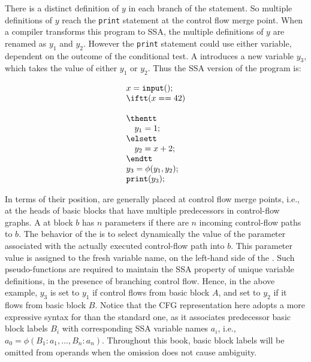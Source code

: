 There is a distinct definition of $y$ in each branch of the \iftt statement. 
So multiple definitions of $y$ reach the \texttt{print} statement at the control flow merge point. 
When a compiler transforms this program to SSA, the multiple definitions of $y$ are renamed as $y_1$ and $y_2$. 
However the \texttt{print} statement could use either variable, dependent on the outcome of the \iftt conditional test. 
A \phifun introduces a new variable $y_3$, which takes the value of either $y_1$ or $y_2$. 
Thus the SSA version of the program is:
\smallskip

\begin{minipage}{0.4\textwidth}
\begin{equation*}
\begin{array}{l}
x = \texttt{input}();\\
\iftt (x == 42)\\
\\
\thentt\\
\quad    y_1 = 1;\\
\elsett\\
\quad    y_2 = x + 2;\\
\endtt\\
y_3 = \phi(y_1,y_2);\\
\texttt{print}(y_3);\\
\end{array}
\end{equation*}
\end{minipage}
\begin{minipage}{0.4\textwidth}
\strut
\end{minipage}
\bigskip


In terms of their position, \phifuns{} are generally placed at control flow merge points, i.e., at the heads of basic blocks that have multiple predecessors in control-flow graphs. 
A \phifun at block $b$ has $n$ parameters if there are $n$ incoming control-flow paths to $b$. 
The behavior of the \phifun is to select dynamically the value of the parameter associated with the actually executed control-flow path into $b$. 
This parameter value is assigned to the fresh variable name, on the left-hand side of the \phifun. 
Such pseudo-functions are required to maintain the SSA property of unique variable definitions, in the presence of branching control flow. 
Hence, in the above example, $y_3$ is set to $y_1$ if control flows from basic block $A$, and set to $y_2$ if it flows from basic block $B$. 
Notice that the CFG representation here adopts a more expressive syntax for \phifuns than the standard one, as it associates predecessor basic block labels $B_i$ with corresponding SSA variable names $a_i$, i.e.,\ $a_0 = \phi(B_1:a_1, \ldots, B_n:a_n)$. 
Throughout this book, basic block labels will be omitted from \phifun operands when the omission does not cause ambiguity.

